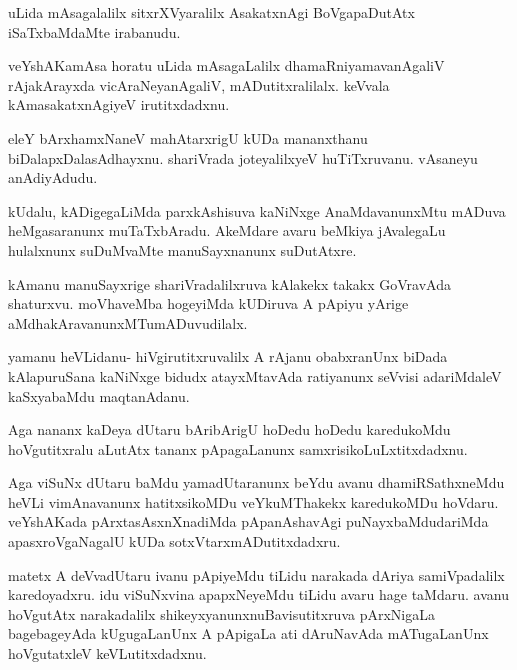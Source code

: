 \documentclass{article}
\begin{document}
\begin{mn}%
uLida mAsagalalilx sitxrXVyaralilx AsakatxnAgi BoVgapaDutAtx iSaTxbaMdaMte irabanudu.
\end{mn}

\begin{mn}%
veYshAKamAsa horatu uLida mAsagaLalilx dhamaRniyamavanAgaliV rAjakArayxda 
vicAraNeyanAgaliV, mADutitxralilalx. keVvala kAmasakatxnAgiyeV irutitxdadxnu.
\end{mn}

\begin{mn}%
eleY bArxhamxNaneV mahAtarxrigU kUDa mananxthanu biDalapxDalasAdhayxnu. shariVrada 
joteyalilxyeV huTiTxruvanu. vAsaneyu anAdiyAdudu.
\end{mn}

\begin{mn}%
kUdalu, kADigegaLiMda parxkAshisuva kaNiNxge AnaMdavanunxMtu mADuva heMgasaranunx 
muTaTxbAradu. AkeMdare avaru beMkiya jAvalegaLu hulalxnunx suDuMvaMte manuSayxnanunx 
suDutAtxre.
\end{mn}

\begin{mn}%
kAmanu manuSayxrige shariVradalilxruva kAlakekx takakx GoVravAda shaturxvu. moVhaveMba 
hogeyiMda kUDiruva A pApiyu yArige aMdhakAravanunxMTumADuvudilalx.
\end{mn}



\begin{mn}%
yamanu heVLidanu- hiVgirutitxruvalilx A rAjanu obabxranUnx  biDada kAlapuruSana kaNiNxge 
bidudx atayxMtavAda ratiyanunx seVvisi adariMdaleV kaSxyabaMdu maqtanAdanu.
\end{mn}

\begin{mn}%
Aga nananx kaDeya dUtaru bAribArigU hoDedu hoDedu karedukoMdu hoVgutitxralu aLutAtx tananx 
pApagaLanunx samxrisikoLuLxtitxdadxnu.
\end{mn}

\begin{mn}%
Aga viSuNx dUtaru baMdu yamadUtaranunx beYdu avanu dhamiRSathxneMdu heVLi vimAnavanunx 
hatitxsikoMDu veYkuMThakekx karedukoMDu hoVdaru. veYshAKada pArxtasAsxnXnadiMda 
pApanAshavAgi puNayxbaMdudariMda apasxroVgaNagalU kUDa sotxVtarxmADutitxdadxru.
\end{mn}

\begin{mn}%
matetx A deVvadUtaru ivanu pApiyeMdu tiLidu narakada dAriya samiVpadalilx karedoyadxru. 
idu viSuNxvina apapxNeyeMdu tiLidu avaru hage taMdaru. avanu hoVgutAtx narakadalilx 
shikeyxyanunxnuBavisutitxruva pArxNigaLa bagebageyAda kUgugaLanUnx A pApigaLa ati 
dAruNavAda mATugaLanUnx hoVgutatxleV keVLutitxdadxnu.
\end{mn}
\end{document}
